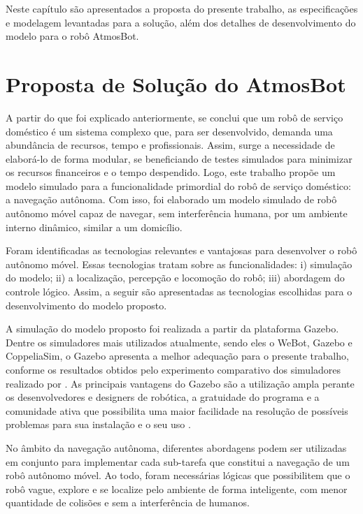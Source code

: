 Neste capítulo são apresentados a proposta do presente trabalho, as especificações e modelagem levantadas para a solução, além dos detalhes de desenvolvimento do modelo para o robô AtmosBot.

\section{Proposta de Solução do AtmosBot} 

A partir do que foi explicado anteriormente, se conclui que um robô de serviço doméstico é um sistema complexo que,  para ser desenvolvido, demanda uma abundância de recursos, tempo e profissionais. Assim, surge a necessidade de elaborá-lo de forma modular, se beneficiando de testes simulados para minimizar os recursos financeiros e o tempo despendido. Logo, este trabalho propõe um modelo simulado para a funcionalidade primordial do robô de serviço doméstico: a navegação autônoma. Com isso, foi elaborado um modelo simulado de robô autônomo móvel capaz de navegar, sem interferência humana, por um ambiente interno dinâmico, similar a um domicílio. 

Foram identificadas as tecnologias relevantes e vantajosas para desenvolver o robô autônomo móvel. Essas tecnologias tratam sobre as funcionalidades: i) simulação do modelo; ii) a localização, percepção e locomoção do robô; iii) abordagem do controle lógico. Assim, a seguir são apresentadas as tecnologias escolhidas para o desenvolvimento do modelo proposto.

A simulação do modelo proposto foi realizada a partir da plataforma Gazebo. Dentre os simuladores mais utilizados atualmente, sendo eles o WeBot, Gazebo e CoppeliaSim, o Gazebo apresenta a melhor adequação para o presente trabalho, conforme os resultados obtidos pelo experimento comparativo dos simuladores realizado por \citet{pickSimulatorFarley:2022}. As principais vantagens do Gazebo são a utilização ampla perante os desenvolvedores e designers de robótica, a gratuidade do programa e a comunidade ativa que possibilita uma maior facilidade na resolução de possíveis problemas para sua instalação e o seu uso \cite{gazeboDesigns:2004, pickSimulatorFarley:2022}. 

No âmbito da navegação autônoma, diferentes abordagens podem ser utilizadas em conjunto para implementar cada sub-tarefa que constitui a navegação de um robô autônomo móvel. Ao todo, foram necessárias lógicas que possibilitem que o robô vague, explore e se localize pelo ambiente de forma inteligente, com menor quantidade de colisões e sem a interferência de humanos.

